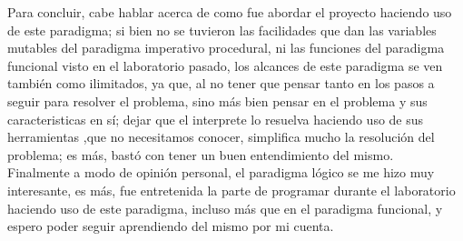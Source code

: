 Para concluir, cabe hablar acerca de como fue abordar el proyecto haciendo uso de este paradigma; si bien no se tuvieron las facilidades que dan las variables mutables 
 del paradigma imperativo procedural, ni las funciones del paradigma funcional visto en el laboratorio pasado, los alcances de este paradigma se ven también como ilimitados, 
 ya que, al no tener que pensar tanto en los pasos a seguir para resolver el problema, sino más bien pensar en el problema y sus caracteristicas en sí; dejar que el interprete lo resuelva 
 haciendo uso de sus herramientas ,que no necesitamos conocer, simplifica mucho la resolución del problema; es más, bastó con tener un buen entendimiento del mismo.\\

 Finalmente a modo de opinión personal, el paradigma lógico se me hizo muy interesante, es más, fue entretenida la parte de programar durante el laboratorio haciendo uso de este 
 paradigma, incluso más que en el paradigma funcional, y espero poder seguir aprendiendo del mismo por mi cuenta.